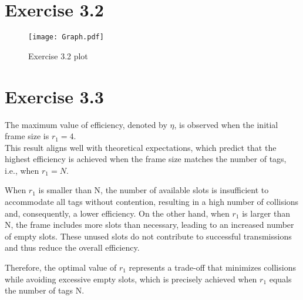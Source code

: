 \section{Exercise 3.2}

\begin{figure}[H]
    \centering
    \texttt{[image: Graph.pdf]}
    \caption{Exercise 3.2 plot}
\end{figure}

\section{Exercise 3.3}
The maximum value of efficiency, denoted by $\eta$, is observed when the initial frame size is $r_1 = 4$. \\
This result aligns well with theoretical expectations, which predict that the highest efficiency is achieved when the frame size matches the number of tags, i.e., when $r_1 = N$.

When $r_1$ is smaller than N, the number of available slots is insufficient to accommodate all tags without contention, resulting in a high number of collisions and, consequently, a lower efficiency. On the other hand, when $r_1$ is larger than N, the frame includes more slots than necessary, leading to an increased number of empty slots. These unused slots do not contribute to successful transmissions and thus reduce the overall efficiency.

Therefore, the optimal value of $r_1$ represents a trade-off that minimizes collisions while avoiding excessive empty slots, which is precisely achieved when $r_1$ equals the number of tags N.
